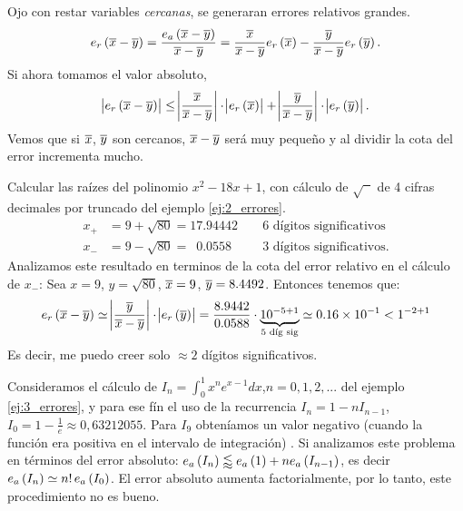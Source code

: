 \begin{obs}
    Ojo con restar variables \emph{cercanas}, se generaran errores relativos grandes.
    \[
	e_r\left( \overline{x}-\overline{y}\right)  = \dfrac{e_a\left( \overline{x} - \overline{y}\right) }{\overline{x}-\overline{y}} = \dfrac{\overline{x}}{\overline{x}-\overline{y}}e_r\left( \overline{x}\right)  - \dfrac{\overline{y}}{\overline{x}-\overline{y}}e_r\left( \overline{y}\right).
    \]
    Si ahora tomamos el valor absoluto,
    \[
	\abs{e_r\left( \overline{x}-\overline{y}\right)} \leq \abs{\dfrac{\overline{x}}{\overline{x}-\overline{y}}}\cdot\abs{e_r\left( \overline{x}\right)} + \abs{\dfrac{\overline{y}}{\overline{x}-\overline{y}}}\cdot\abs{e_r\left( \overline{y}\right)}.
    \]
    Vemos que si $\overline{x}$, $\overline{y}$ son cercanos, $\overline{x}-\overline{y}$ será muy pequeño y al dividir la cota del error incrementa mucho.
\end{obs}

\begin{example}
	Calcular las raízes del polinomio  $x^2 - 18x + 1$, con cálculo de $\sqrt{\phantom{x}}$ de 4 cifras decimales por truncado del ejemplo \ref{ej:2_errores}.
	\begin{align*}
		x_+ &= 9 + \sqrt{80} = 17.94442 &&\text{ 6 dígitos significativos} \\
		x_- &= 9 - \sqrt{80} = \enspace 0.0558 &&\text{ 3 dígitos significativos}.
	\end{align*}
	Analizamos este resultado en terminos de la cota del error relativo en el cálculo de $x_-$: Sea $x = 9$, $y = \sqrt{80}$, $\overline{x}=9$, $\overline{y}=8.4492$. Entonces tenemos que:
	\[
		e_r\left( \overline{x}-\overline{y}\right)  \simeq \abs{\frac{\overline{y}}{\overline{x}-\overline{y}}}\cdot\abs{e_r\left( \overline{y}\right)} = \dfrac{8.9442}{0.0588}\cdot \underbrace{10^{-5+1}}_{\text{5 díg sig}} \simeq \SI{0.16e-1}{} < 1^{-2+1}
	\]
	Es decir, me puedo creer solo $\approx 2$ dígitos significativos.
\end{example}

\begin{example}
	Consideramos el cálculo de $I_n = \int_{0}^{1}x^ne^{x-1}dx$,$n = 0,1,2,...$ del ejemplo \ref{ej:3_errores}, y para ese fín el uso de la recurrencia $I_n = 1 - nI_{n-1}$, $I_0 = 1 - \frac{1}{e} \approx 0,63212055$. Para $I_9$ obteníamos un valor negativo (cuando la función era positiva en el intervalo de integración) . Si analizamos este problema en términos del error absoluto: $e_a\left( I_n\right)  \lessapprox e_a\left( 1\right)  + ne_a\left( I_{n-1}\right) $, es decir $e_a\left( I_n\right)  \simeq n!\,e_a\left( I_0\right) $. El error absoluto aumenta factorialmente, por lo tanto, este procedimiento no es bueno.
\end{example}

